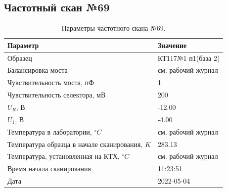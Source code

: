 \subsection{Частотный скан №69}
\begin{table}[!ht]
    \centering
    \caption{Параметры частотного скана №69.}
    \begin{tabular}{|l|l|}
        \hline
        Параметр                                       & Значение                  \\ \hline
        Образец                                        & КТ117№1 п1(база 2)        \\ \hline
        Балансировка моста                             & см. рабочий журнал        \\ \hline
        Чувствительность моста, пФ                     & 1                         \\ \hline
        Чувствительность селектора, мВ                 & 200                       \\ \hline
        $U_R$, В                                       & -12.00                    \\ \hline
        $U_1$, В                                       & -4.00                     \\ \hline
        Температура в лаборатории, $^\circ C$          & см. рабочий журнал        \\ \hline
        Температура образца в начале сканирования, $K$ & 283.13                    \\ \hline
        Температура, установленная на КТХ, $^\circ C$  & см. рабочий журнал        \\ \hline
        Время начала сканирования                      & 11:23:51                  \\ \hline
        Дата                                           & 2022-05-04                \\ \hline
    \end{tabular}
    \label{table:frequency_scan_69}
\end{table}

